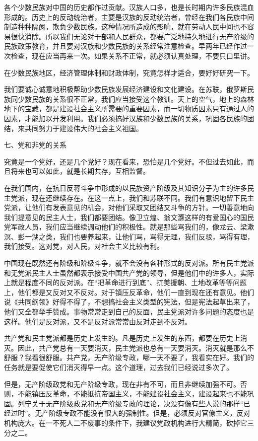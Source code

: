 \documentclass[UTF8, 12pt, a4paper]{ctexrep}
\begin{document}
各个少数民族对中国的历史都作过贡献。汉族人口多，也是长时期内许多民族混血形成的。历史上的反动统治者，主要是汉族的反动统治者，曾经在我们各民族中间制造种种隔阂，欺负少数民族。这种情况所造成的影响，就在劳动人民中间也不容易很快消除。所以我们无论对干部和人民群众，都要广泛地持久地进行无产阶级的民族政策教育，并且要对汉族和少数民族的关系经常注意检查。早两年已经作过一次检查，现在应当再来一次。如果关系不正常，就必须认真处理，不要只口里讲。

在少数民族地区，经济管理体制和财政体制，究竟怎样才适合，要好好研究一下。

我们要诚心诚意地积极帮助少数民族发展经济建设和文化建设。在苏联，俄罗斯民族同少数民族的关系很不正常，我们应当接受这个教训。天上的空气，地上的森林地下的宝藏，都是建设社会主义所需要的重要因素，而一切物质因素只有通过人的因素，才能加以开发利用。我们必须搞好汉族和少数民族的关系，巩固各民族的团结，来共同努力于建设伟大的社会主义祖国。

七、党和非党的关系

究竟是一个党好，还是几个党好？现在看来，恐怕是几个党好。不但过去如此，而且将来也可以如此，就是长期共存，互相监督。

在我们国内，在抗日反蒋斗争中形成的以民族资产阶级及其知识分子为主的许多民主党派，现在还继续存在。在这一点上，我们和苏联不同。我们有意识地留下民主党派，让他们有发表意见的机会，对他们采取又团结又斗争的方针。一切善意地向我们提意见的民主人士，我们都要团结。像卫立煌、翁文灏这样的有爱国心的国民党军政人员，我们应当继续调动他们的积极性。就是那些骂我们的，像龙云、梁漱溟、彭一湖之类，我们也要养起来，让他们骂，骂得无理，我们反驳，骂得有理，我们接受。这对党，对人民，对社会主义比较有利。

中国现在既然还有阶级和阶级斗争，就不会没有各种形式的反对派。所有民主党派和无党派民主人士虽然都表示接受中国共产党的领导，但是他们中的许多人，实际上就是程度不同的反对派。在“把革命进行到底”、抗美援朝、土地改革等等问题上，他们都是又反对又不反对。对于镇压反革命，他们一直到现在还有意见。他们说《共同纲领》好得不得了，不想搞社会主义类型的宪法，但是宪法起草出来了，他们又全都举手赞成。事物常常走到自己的反面，民主党派对许多问题的态度也是这样。他们是反对派，又不是反对派常常由反对走到不反对。

共产党和民主党派都是历史上发生的。凡是历史上发生的东西，都要在历史上消灭。因此，共产党总有一天要消灭，民主党派也总有一天要消灭。消灭就是那么不舒服？我看很舒服。共产党，无产阶级专政，哪一天不要了，我看实在好。我们的任务就是要促使它们消灭得早一点。这个道理，过去我们已经说过多次了。

但是，无产阶级政党和无产阶级专政，现在非有不可，而且非继续加强不可。否则，不能镇压反革命，不能抵抗帝国主义，不能建设社会主义，建设起来也不能巩固。列宁关于无产阶级政党和无产阶级专政的理论，决没有像有些人说的那样“已经过时”。无产阶级专政不能没有很大的强制性。但是，必须反对官僚主义，反对机构庞大。在一不死人二不废事的条件下，我建议党政机构进行大精简，砍掉它三分之二。
\end{document}
